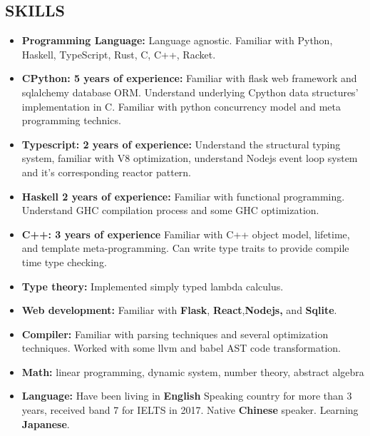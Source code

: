 \documentclass{res}
\begin{document}
\begin{resume}
\section{SKILLS}
    \begin{itemize}[leftmargin=-.2in]
        \setlength\itemsep{-1em}
        \item \textbf{Programming Language:} Language agnostic. Familiar with Python, Haskell, TypeScript, Rust, C, C++, Racket.\\
        \item \textbf{CPython: 5 years of experience:} Familiar with flask web framework and sqlalchemy database ORM.
                  Understand underlying Cpython data structures' implementation in C.
                  Familiar with python concurrency model and meta programming technics. \\
        \item \textbf{Typescript: 2 years of experience:} Understand the structural typing system, familiar with V8 optimization, understand Nodejs event loop system and it's corresponding reactor pattern. \\
        \item \textbf{Haskell 2 years of experience:} Familiar with functional programming. Understand GHC compilation process and some GHC optimization. \\
        \item \textbf{C++: 3 years of experience} Familiar with C++ object model, lifetime, and template meta-programming. Can write type traits to provide compile time type checking. \\
        \item \textbf{Type theory:} Implemented simply typed lambda calculus. \\
        \item \textbf{Web development:} Familiar with \textbf{Flask}, \textbf{React},\textbf{Nodejs,} and \textbf{Sqlite}. \\
        \item \textbf{Compiler:} Familiar with parsing techniques and several optimization techniques. Worked with some llvm and babel AST code transformation. \\
        \item \textbf{Math:} linear programming, dynamic system, number theory, abstract algebra \\
        \item \textbf{Language:} Have been living in \textbf{English} Speaking country for more than 3 years, received band 7 for IELTS in 2017. Native \textbf{Chinese} speaker. Learning \textbf{Japanese}.
    \end{itemize}

\end{resume}
\end{document}

